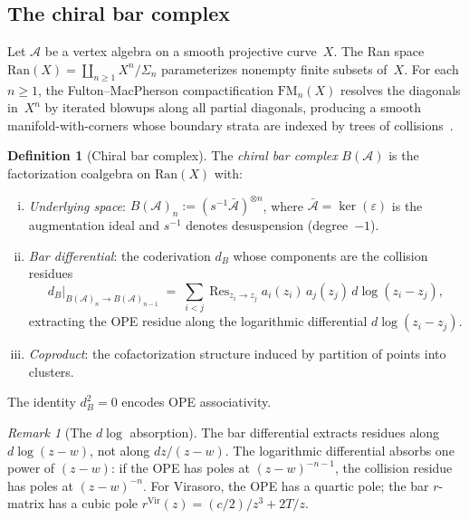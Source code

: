 \documentclass[11pt,reqno]{amsart}
\theoremstyle{definition}
\newtheorem{definition}[theorem]{Definition}
\theoremstyle{remark}
\newtheorem{remark}[theorem]{Remark}
\newcommand{\cA}{\mathcal{A}}
\newcommand{\Ran}{\mathrm{Ran}}
\newcommand{\FM}{\mathrm{FM}}
\newcommand{\Vir}{\mathrm{Vir}}
\DeclareMathOperator{\Res}{Res}
\numberwithin{equation}{section}
\begin{document}
\subsection{The chiral bar complex}\label{subsec:bar-complex}

Let $\cA$ be a vertex algebra on a smooth projective
curve~$X$. The Ran space
$\Ran(X) = \coprod_{n \ge 1} X^n/\Sigma_n$ parameterizes
nonempty finite subsets of~$X$. For each $n \ge 1$, the
Fulton--MacPherson compactification $\FM_n(X)$ resolves
the diagonals in~$X^n$ by iterated blowups along all
partial diagonals, producing a smooth manifold-with-corners
whose boundary strata are indexed by trees of
collisions~\cite{GK}.

\begin{definition}[Chiral bar complex]\label{def:bar-complex}
The \emph{chiral bar complex} $B(\cA)$ is the factorization
coalgebra on $\Ran(X)$ with:
\begin{enumerate}[(i)]
\item \emph{Underlying space}:
 $B(\cA)_n := (s^{-1}\bar{\cA})^{\otimes n}$, where
 $\bar{\cA} = \ker(\varepsilon)$ is the augmentation ideal
 and $s^{-1}$ denotes desuspension (degree~$-1$).

\item \emph{Bar differential}: the coderivation $d_B$ whose
 components are the collision residues
 \[
  d_B|_{B(\cA)_n \to B(\cA)_{n-1}}
  \;=\;
  \sum_{i < j}
  \Res_{z_i \to z_j}
  a_i(z_i)\, a_j(z_j)\, d\!\log(z_i - z_j),
 \]
 extracting the OPE residue along the logarithmic
 differential $d\!\log(z_i - z_j)$.

\item \emph{Coproduct}: the cofactorization structure
 induced by partition of points into clusters.
\end{enumerate}
The identity $d_B^2 = 0$ encodes OPE associativity.
\end{definition}

\begin{remark}[The $d\!\log$ absorption]\label{rem:dlog}
The bar differential extracts residues along
$d\!\log(z - w)$, not along $dz/(z-w)$. The logarithmic
differential absorbs one power of $(z-w)$: if the OPE has
poles at $(z-w)^{-n-1}$, the collision residue has poles
at $(z-w)^{-n}$. For Virasoro, the OPE has a quartic pole;
the bar $r$-matrix has a cubic pole
$r^{\Vir}(z) = (c/2)/z^3 + 2T/z$.
\end{remark}
\end{document}
